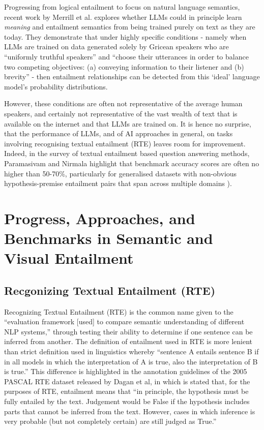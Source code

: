 \documentclass[12pt,twoside]{report}
\begin{document}
Progressing from logical entailment to focus on natural language semantics, recent work by Merrill et al. \cite{merrill-etal-2022-entailment} explores whether LLMs could in principle learn \textit{meaning} and entailment semantics from being trained purely on text as they are today. They demonstrate that under highly specific conditions - namely when LLMs are trained on data generated solely by Gricean speakers who are ``uniformly truthful speakers'' and ``choose their utterances in order to balance two competing objectives: (a) conveying information to their listener and (b) brevity'' - then entailment relationships can be detected from this `ideal' language model's probability distributions. \newline \par

However, these conditions are often not representative of the average human speakers, and certainly not representative of the vast wealth of text that is available on the internet and that LLMs are trained on. It is hence no surprise, that the performance of LLMs, and of AI approaches in general, on tasks involving recognising textual entailment (RTE) leaves room for improvement. Indeed, in the survey of textual entailment based question answering methods, Paramasivam and Nirmala highlight that benchmark accuracy scores are often no higher than 50-70\%, particularly for generalised datasets with non-obvious hypothesis-premise entailment pairs that span across multiple domains \cite{PARAMASIVAM20229644}). 

\section{Progress, Approaches, and Benchmarks in Semantic and Visual Entailment}

\subsection{Recgonizing Textual Entailment (RTE)}

Recognizing Textual Entailment (RTE) is the common name given to the ``evaluation framework [used] to compare semantic understanding of different NLP systems,'' \cite{poliak-2020-survey} through testing their ability to determine if one sentence can be inferred from another. The definition of entailment used in RTE is more lenient than strict definition used in linguistics whereby ``sentence A entails sentence B if in all models in which the interpretation of A is true, also the interpretation of B is true.'' \cite{sep-montague-semantics} This difference is highlighted in the annotation guidelines of the 2005 PASCAL RTE dataset released by Dagan et al, in which is stated that, for the purposes of RTE, entailment means that ``in principle, the hypothesis must be fully entailed by the text. Judgement would be False if the hypothesis includes parts that cannot be inferred from the text. However, cases in which inference is very probable (but not completely certain) are still judged as True.'' \cite{dagan2005} \newline \par
\end{document}
